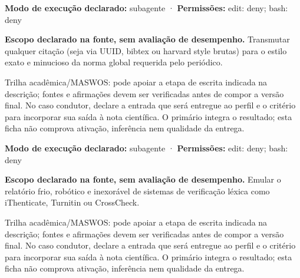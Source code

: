 \begin{arquitetura}
\textbf{Modo de execução declarado:} subagente · \textbf{Permissões:} edit: deny; bash: deny
\end{arquitetura}


\begin{descricao}
\textbf{Escopo declarado na fonte, sem avaliação de desempenho.}
Transmutar qualquer citação (seja via UUID, bibtex ou harvard style brutas) para o estilo exato e minucioso da norma global requerida pelo periódico.
\end{descricao}

\begin{funcao}
Trilha acadêmica/MASWOS: pode apoiar a etapa de escrita indicada na descrição; fontes e afirmações devem ser verificadas antes de compor a versão final. No caso condutor, declare a entrada que será entregue ao perfil e o critério para incorporar sua saída à nota científica. O primário integra o resultado; esta ficha não comprova ativação, inferência nem qualidade da entrega.
\end{funcao}

\begin{arquitetura}
\textbf{Modo de execução declarado:} subagente · \textbf{Permissões:} edit: deny; bash: deny
\end{arquitetura}


\begin{descricao}
\textbf{Escopo declarado na fonte, sem avaliação de desempenho.}
Emular o relatório frio, robótico e inexorável de sistemas de verificação léxica como iThenticate, Turnitin ou CrossCheck.
\end{descricao}

\begin{funcao}
Trilha acadêmica/MASWOS: pode apoiar a etapa de escrita indicada na descrição; fontes e afirmações devem ser verificadas antes de compor a versão final. No caso condutor, declare a entrada que será entregue ao perfil e o critério para incorporar sua saída à nota científica. O primário integra o resultado; esta ficha não comprova ativação, inferência nem qualidade da entrega.
\end{funcao}

